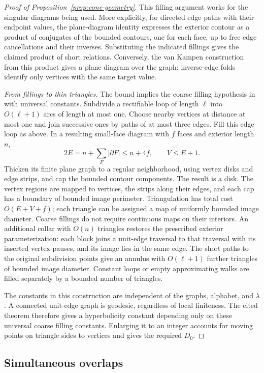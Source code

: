 \begin{proof}[Proof of Proposition~\ref{prop:cone-geometry}]
This filling argument works for the singular diagrams being used. More
explicitly, for directed edge paths with their endpoint values, the
plane-diagram identity expresses the exterior contour as a product of
conjugates of the bounded contours, one for each face, up to free edge
cancellations and their inverses. Substituting the indicated fillings
gives the claimed product of short relations. Conversely, the van Kampen
construction from this product gives a plane diagram over the graph:
inverse-edge folds identify only vertices with the same target value.

\emph{From fillings to thin triangles.}
The bound implies the coarse filling hypothesis in
\cite[III.H.2.1 and III.H.2.9]{BH1999} with universal constants. Subdivide a rectifiable
loop of length \(\ell\) into \(O(\ell+1)\) arcs of length at most one.
Choose nearby vertices at distance at most one and join successive ones
by paths of at most three edges. Fill this edge loop as above. In a
resulting small-face diagram with \(f\) faces and exterior length \(n\),
\[
2E=n+\sum_F|\partial F|\le n+4f,\qquad V\le E+1.
\]
Thicken its finite plane graph to a regular neighborhood, using vertex
disks and edge strips, and cap the bounded contour components. The result
is a disk. The vertex regions are mapped to vertices, the strips along
their edges, and each cap has a boundary of bounded image perimeter.
Triangulation has total cost \(O(E+V+f)\); each triangle can be assigned a
map of uniformly bounded image diameter. Coarse fillings do not require
continuous maps on their interiors. An additional collar with \(O(n)\)
triangles restores the prescribed exterior parameterization: each block
joins a unit-edge traversal to that traversal with its inserted vertex
pauses, and its image lies in the same edge. The short paths to the original
subdivision points give an annulus with \(O(\ell+1)\) further triangles
of bounded image diameter. Constant loops or empty approximating walks
are filled separately by a bounded number of triangles.

The constants in this construction are independent of the graphs,
alphabet, and \(\lambda\). A connected unit-edge graph is geodesic,
regardless of local finiteness. The cited theorem therefore gives a
hyperbolicity constant depending only on these universal coarse filling
constants. Enlarging it to an integer accounts for moving points on
triangle sides to vertices and gives the required \(D_0\).
\end{proof}

\subsection{Simultaneous overlaps}

